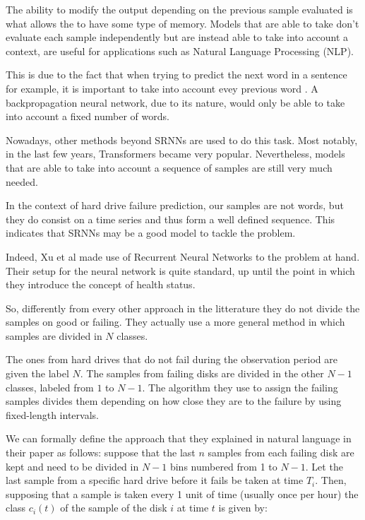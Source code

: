The ability to modify the output depending on the previous sample evaluated is what allows the to have some type of memory.
Models that are able to take don't evaluate each sample independently but are instead able to take into account a context, are useful for applications such as Natural Language Processing (NLP).

This is due to the fact that when trying to predict the next word in a sentence for example, it is important to take into account evey previous word \cite{tarwani2017survey}.
A backpropagation neural network, due to its nature, would only be able to take into account a fixed number of words.

Nowadays, other methods beyond SRNNs are used to do this task.
Most notably, in the last few years, Transformers\cite{vaswani2017attention} became very popular.
Nevertheless, models that are able to take into account a sequence of samples are still very much needed.

In the context of hard drive failure prediction, our samples are not words, but they do consist on a time series and thus form a well defined sequence.
This indicates that SRNNs may be a good model to tackle the problem.

Indeed, Xu et al \cite{Xu16} made use of Recurrent Neural Networks to the problem at hand.
Their setup for the neural network is quite standard, up until the point in which they introduce the concept of health status.

So, differently from every other approach in the litterature they do not divide the samples on good or failing.
They actually use a more general method in which samples are divided in $N$ classes.

The ones from hard drives that do not fail during the observation period are given the label $N$.
The samples from failing disks are divided in the other $N-1$ classes, labeled from $1$ to $N-1$.
The algorithm they use to assign the failing samples divides them depending on how close they are to the failure by using fixed-length intervals.

We can formally define the approach that they explained in natural language in their paper as follows:
suppose that the last $n$ samples from each failing disk are kept and need to be divided in $N-1$ bins numbered from 1 to $N-1$.
Let the last sample from a specific hard drive before it fails be taken at time $T_i$.
Then, supposing that a sample is taken every 1 unit of time (usually once per hour) the class $c_i(t)$ of the sample of the disk $i$ at time $t$ is given by:

